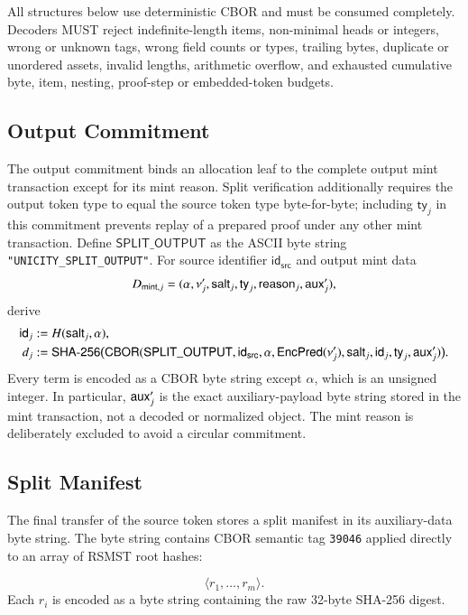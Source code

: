 All structures below use deterministic CBOR and must be consumed completely. Decoders MUST reject indefinite-length items, non-minimal heads or integers, wrong or unknown tags, wrong field counts or types, trailing bytes, duplicate or unordered assets, invalid lengths, arithmetic overflow, and exhausted cumulative byte, item, nesting, proof-step or embedded-token budgets.

\subsection{Output Commitment}\label{app:split-output-commitment}

The output commitment binds an allocation leaf to the complete output mint transaction except for its mint reason. Split verification additionally requires the output token type to equal the source token type byte-for-byte; including $\mathsf{ty}_j$ in this commitment prevents replay of a prepared proof under any other mint transaction. Define $\mathsf{SPLIT\_OUTPUT}$ as the ASCII byte string \texttt{"UNICITY\_SPLIT\_OUTPUT"}. For source identifier $\mathsf{id}_\mathsf{src}$ and output mint data
\[
D_{\mathsf{mint},j}
=(\alpha,\nu'_j,\mathsf{salt}_j,\mathsf{ty}_j,
  \mathsf{reason}_j,\mathsf{aux}'_j),
\]
derive
\[
\begin{split}
\mathsf{id}_j &:= H(\mathsf{salt}_j,\alpha),\\
d_j &:= \mathsf{SHA\text{-}256}\bigl(\mathsf{CBOR}(
  \mathsf{SPLIT\_OUTPUT},
  \mathsf{id}_\mathsf{src},
  \alpha,
  \mathsf{EncPred}(\nu'_j),
  \mathsf{salt}_j,
  \mathsf{id}_j,
  \mathsf{ty}_j,
  \mathsf{aux}'_j
)\bigr).
\end{split}
\]
Every term is encoded as a CBOR byte string except $\alpha$, which is an unsigned integer. In particular, $\mathsf{aux}'_j$ is the exact auxiliary-payload byte string stored in the mint transaction, not a decoded or normalized object. The mint reason is deliberately excluded to avoid a circular commitment.

\subsection{Split Manifest}\label{app:split-manifest}

The final transfer of the source token stores a split manifest in its auxiliary-data byte string. The byte string contains CBOR semantic tag \texttt{39046} applied directly to an array of RSMST root hashes:

\[
\langle r_1,\ldots,r_m\rangle.
\]
Each $r_i$ is encoded as a byte string containing the raw 32-byte SHA-256 digest.

